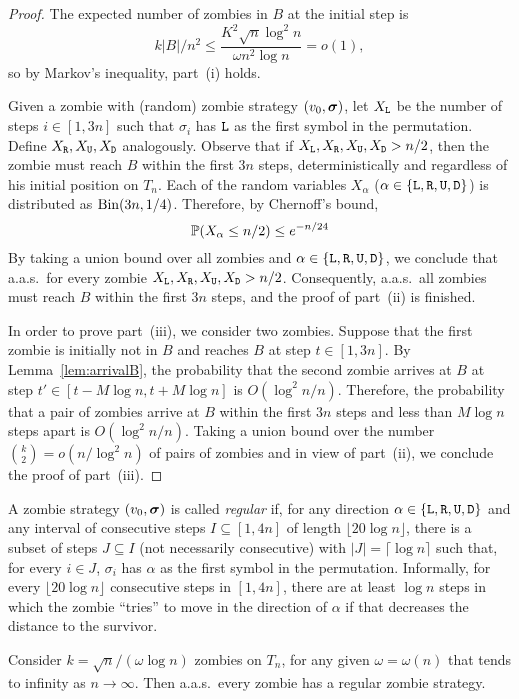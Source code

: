 \documentclass[12pt]{amsart}
\begin{document}
\begin{proof}
The expected number of zombies in $B$ at the initial step is
\[
k|B|/n^2 \le \frac{K^2 \sqrt n \log^2n}{\omega n^2 \log n} = o(1),
\]
so by Markov's inequality, part~(i) holds.

\bigskip

Given a zombie with (random) zombie strategy $(v_0,{\boldsymbol\sigma})$, let $X_{\mathtt L}$ be the number of steps $i\in[1,3n]$ such that $\sigma_i$ has ${\mathtt L}$ as the first symbol in the permutation. Define
$X_{\mathtt R},X_{\mathtt U},X_{\mathtt D}$ analogously. Observe that if $X_{\mathtt L},X_{\mathtt R},X_{\mathtt U},X_{\mathtt D}>n/2$, then the zombie must reach $B$ within the first $3n$ steps, deterministically and regardless of his initial position
on $T_n$. Each of the random variables $X_\alpha$ ($\alpha\in\{{\mathtt L},{\mathtt R},{\mathtt U},{\mathtt D}\}$) is distributed as $\mathrm{Bin}(3n,1/4)$. Therefore, by Chernoff's bound,
\[
\mathbb{P}(X_\alpha \le n/2) \le e^{- n/24}
\]
By taking a union bound over all zombies and $\alpha\in\{{\mathtt L},{\mathtt R},{\mathtt U},{\mathtt D}\}$, we conclude that a.a.s.\ for every zombie $X_{\mathtt L},X_{\mathtt R},X_{\mathtt U},X_{\mathtt D}>n/2$. Consequently, a.a.s.\ all zombies must reach
$B$ within the first $3n$ steps, and the proof of part~(ii) is finished.

\bigskip

In order to prove part~(iii), we consider two zombies. Suppose that the first zombie is initially not in $B$ and reaches $B$ at step $t\in[1,3n]$. By Lemma~\ref{lem:arrivalB}, the probability that
the second zombie arrives at $B$ at step $t'\in[t-M\log n,t+M\log n]$ is $O(\log^2 n/n)$. Therefore, the probability that a pair of zombies arrive at $B$ within the first $3n$ steps and less than
$M\log n$ steps apart is $O(\log^2 n/n)$. Taking a union bound over the number $\binom{k}{2} = o(n/\log^2n)$ of pairs of zombies and in view of part~(ii), we conclude the proof of part~(iii).
\end{proof}
A zombie strategy $(v_0,{\boldsymbol\sigma})$ is called \emph{regular} if, for any direction $\alpha\in\{{\mathtt L},{\mathtt R},{\mathtt U},{\mathtt D}\}$ and any interval of consecutive steps $I \subseteq [1,4n]$ of length $ \lfloor 20\log n \rfloor $, there is a subset of
steps $J\subseteq I$ (not necessarily consecutive) with $|J|= \lceil \log n \rceil$ such that, for every $i\in J$, $\sigma_i$ has $\alpha$ as the first symbol in the permutation. Informally, for every
$ \lfloor 20\log n \rfloor $ consecutive steps in $[1,4n]$, there are at least $\log n$ steps in which the zombie ``tries'' to move in the direction of $\alpha$ if that decreases the distance to the survivor.
\begin{lemma}\label{lem:regulartorus}
Consider $k=\sqrt n/(\omega \log n)$ zombies on $T_n$, for any given $\omega = \omega(n)$ that tends to infinity as $n\to \infty$. Then a.a.s.\ every zombie has a regular zombie strategy.
\end{lemma}
\end{document}
